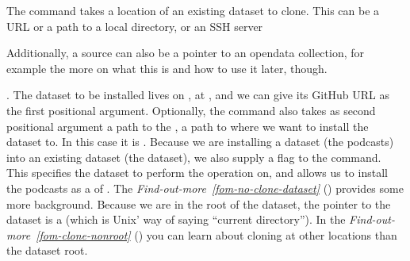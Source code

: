 \sphinxAtStartPar
The  command takes a location of an existing dataset to clone. This 
can be a URL or a path to a local directory, or an SSH server%
\begin{footnote}\sphinxAtStartFootnote
Additionally, a source can also be a pointer to an open\sphinxhyphen{}data collection,
for example the {\hyperref[\detokenize{glossary:term-the-DataLad-superdataset}]{}} \textendash{} more on what this is and how to
use it later, though.
%
\end{footnote}. The dataset
to be installed lives on {\hyperref[\detokenize{glossary:term-GitHub}]{}}, at
,
and we can give its GitHub URL as the  first positional argument.
Optionally, the command also takes as second positional argument a path to the ,
\textendash{} a path to where we want to install the dataset to. In this case it is .
Because we are installing a dataset (the podcasts) into an existing dataset (the 
dataset), we also supply a  flag to the command.
This specifies the dataset to perform the operation on, and allows us to install
the podcasts as a  of .
The \textit{Find-out-more}~{\findoutmoreiconinline}\textit{\ref{fom-no-clone-dataset}} {\hyperref[\detokenize{basics/101-105-install:fom-no-clone-dataset}]{}} () provides some more background.
Because we are in the root
of the  dataset, the pointer to the dataset is a  (which is Unix’
way of saying “current directory”). In the \textit{Find-out-more}~{\findoutmoreiconinline}\textit{\ref{fom-clone-nonroot}} {\hyperref[\detokenize{basics/101-105-install:fom-clone-nonroot}]{}} ()
you can learn about cloning at other locations than the dataset root.

